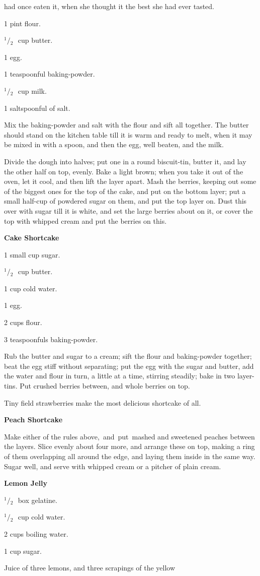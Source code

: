 \documentclass[11pt]{book}
\newcommand{\indpar}{\par\noindent\hspace*{\parindent}}
\newcommand{\ingredient}{\indpar}
\newcommand{\instruction}{\indpar}
\newcommand{\OneHalf}{\ensuremath{{}^1\!\!/\!{}_2\mbox{\ }}}
\newenvironment{RecipeTitle}{\medskip\begin{center}\large\bf }{\end{center}\smallskip}
\begin{document}
had once eaten it, when she thought it the best she had ever
tasted.
\ingredient  1 pint flour.
\ingredient  \OneHalf cup butter.
\ingredient  1 egg.
\ingredient  1 teaspoonful baking-powder.
\ingredient  \OneHalf cup milk.
\ingredient  1 saltspoonful of salt.
\instruction  Mix the baking-powder and salt with the flour and sift all
together.  The butter should stand on the kitchen table till
it is warm and ready to melt, when it may be mixed in with a
spoon, and then the egg, well beaten, and the milk.
\instruction  Divide the dough into halves; put one in a round biscuit-tin,
butter it, and lay the other half on top, evenly. Bake
a light brown; when you take it out of the oven, let it
cool, and then lift the layer apart.  Mash the berries,
keeping out some of the biggest ones for the top of the cake,
and put on the bottom layer; put a small half-cup of powdered
sugar on them, and put the top layer on.  Dust this over with
sugar till it is white, and set the large berries about on it,
or cover the top with whipped cream and put the berries on
this.
\begin{RecipeTitle}
Cake Shortcake\label{cake_shortcake}
\end{RecipeTitle}
\ingredient  1 small cup sugar.
\ingredient  \OneHalf cup butter.
\ingredient  1 cup cold water.
\ingredient  1 egg.
\ingredient  2 cups flour.
\ingredient  3 teaspoonfuls baking-powder.
\instruction  Rub the butter and sugar to a cream; sift the flour and
baking-powder together; beat the egg stiff without separating;
put the egg with the sugar and butter, add the water and
flour in turn, a little at a time, stirring steadily; bake in
two layer-tins.  Put crushed berries between, and whole
berries on top.
\instruction  Tiny field strawberries make the most delicious shortcake of
all.
\begin{RecipeTitle}
Peach Shortcake\label{peach_shortcake}
\end{RecipeTitle}
\instruction  Make either of the rules above,\, and\, put\, mashed and sweetened
peaches between the layers.  Slice evenly about four more, and
arrange these on top, making a ring of them overlapping all
around the edge, and laying them inside in the same way.
Sugar well, and serve with whipped cream or a pitcher of plain
cream.
\begin{RecipeTitle}
Lemon Jelly\label{lemon_jelly}
\end{RecipeTitle}
\ingredient  \OneHalf box gelatine.
\ingredient  \OneHalf cup cold water.
\ingredient  2 cups boiling water.
\ingredient  1 cup sugar.
\ingredient  Juice of three lemons, and three scrapings of the yellow
\end{document}
